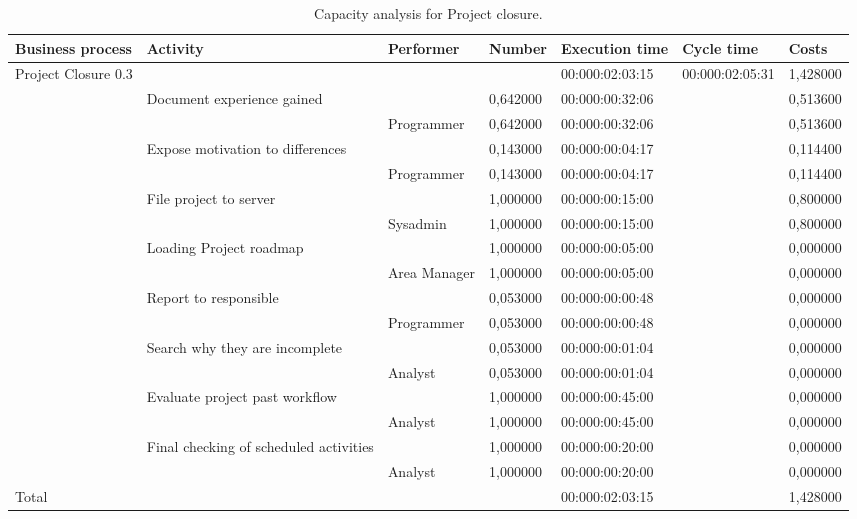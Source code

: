 \begin{landscape}
\begin{table}
\centering
{\tiny
\begin{tabular}{|l|l|l|l|l|l|l|}
Business process&Activity&Performer&Number&Execution time&Cycle time&Costs\\
\hline
Project Closure 0.3&&&&00:000:02:03:15&00:000:02:05:31&1,428000\\
\hline
&Document experience gained &&0,642000&00:000:00:32:06&&0,513600\\
\hline
&&Programmer &0,642000&00:000:00:32:06&&0,513600\\
\hline
&Expose motivation to differences &&0,143000&00:000:00:04:17&&0,114400\\
\hline
&&Programmer &0,143000&00:000:00:04:17&&0,114400\\
\hline
&File project to server &&1,000000&00:000:00:15:00&&0,800000\\
\hline
&&Sysadmin &1,000000&00:000:00:15:00&&0,800000\\
\hline
&Loading Project roadmap &&1,000000&00:000:00:05:00&&0,000000\\
\hline
&&Area Manager &1,000000&00:000:00:05:00&&0,000000\\
\hline
&Report to responsible &&0,053000&00:000:00:00:48&&0,000000\\
\hline
&&Programmer &0,053000&00:000:00:00:48&&0,000000\\
\hline
&Search why they are incomplete &&0,053000&00:000:00:01:04&&0,000000\\
\hline
&&Analyst &0,053000&00:000:00:01:04&&0,000000\\
\hline
&Evaluate project past workflow &&1,000000&00:000:00:45:00&&0,000000\\
\hline
&&Analyst &1,000000&00:000:00:45:00&&0,000000\\
\hline
&Final checking of scheduled activities &&1,000000&00:000:00:20:00&&0,000000\\
\hline
&&Analyst &1,000000&00:000:00:20:00&&0,000000\\
\hline
Total&&&&00:000:02:03:15&&1,428000
\end{tabular}
}
\caption{Capacity analysis for Project closure.}
\end{table}
\end{landscape}
%

%